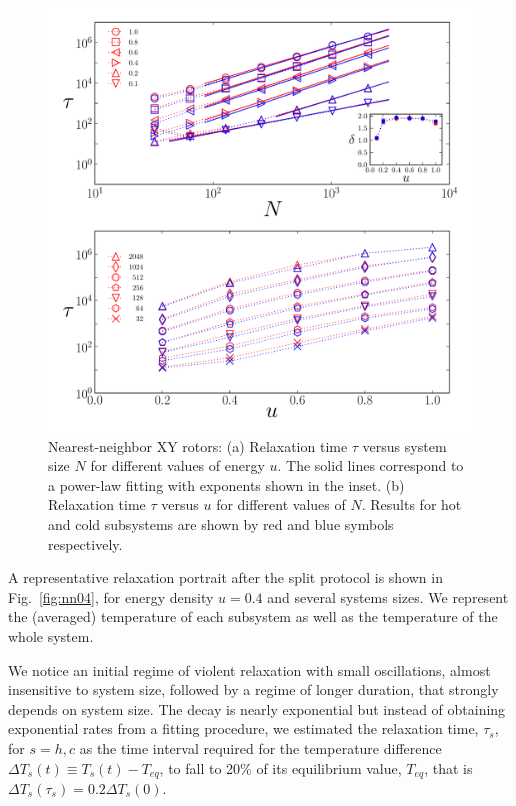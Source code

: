 \documentclass[aps,pre,showpacs,twocolumn,superscriptaddress,floatfix]{revtex4-1}
\begin{document}
\begin{figure}[h!]
 \centering
 \includegraphics[width=1.0\linewidth]{./Taus1over5_XY.pdf}
 \caption{Nearest-neighbor XY rotors: 
(a) Relaxation time $\tau$ versus  system size $N$
 for different values of energy $u$. 
The solid lines correspond to a power-law fitting with exponents shown in the inset. 
(b) Relaxation time $\tau$ versus  $u$ for different values of $N$. 
Results for hot and cold subsystems are shown by red and blue symbols respectively.  
}
 \label{fig:Taus1over5_XY}
\end{figure}

A representative relaxation portrait after the split protocol is shown in Fig.~\ref{fig:nn04},  
for energy density $u=0.4$ and several systems sizes. 
We represent the (averaged) temperature of each subsystem as well as the temperature of the whole system. 
%

We notice an initial regime of violent relaxation with small oscillations, 
almost insensitive to system size, followed by a  regime of longer duration, 
that strongly depends on system size. 
%
%
The decay is nearly exponential but instead of obtaining exponential rates 
from a fitting procedure, we estimated the relaxation time,  $\tau_s$, for $s=h,c$   
as the time interval required for the temperature difference 
$\Delta T_s(t) \equiv T_s(t) - T_{eq}$,  
to fall  to 20\% of its equilibrium value, $T_{eq}$,   
that is 
%
 $\Delta T_s(\tau_s)       = 0.2 \Delta T_s(0)$.
\end{document}
